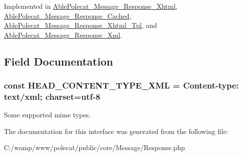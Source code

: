 Implemented in \hyperlink{class_able_polecat___message___response___xhtml_a858ab2a95af7d312509c203de5c6fb11}{Able\+Polecat\+\_\+\+Message\+\_\+\+Response\+\_\+\+Xhtml}, \hyperlink{class_able_polecat___message___response___cached_a858ab2a95af7d312509c203de5c6fb11}{Able\+Polecat\+\_\+\+Message\+\_\+\+Response\+\_\+\+Cached}, \hyperlink{class_able_polecat___message___response___xhtml___tpl_a858ab2a95af7d312509c203de5c6fb11}{Able\+Polecat\+\_\+\+Message\+\_\+\+Response\+\_\+\+Xhtml\+\_\+\+Tpl}, and \hyperlink{class_able_polecat___message___response___xml_a858ab2a95af7d312509c203de5c6fb11}{Able\+Polecat\+\_\+\+Message\+\_\+\+Response\+\_\+\+Xml}.



\subsection{Field Documentation}
\hypertarget{interface_able_polecat___message___response_interface_a91ffe0d292e492f470fd5917d700ce9a}{}
\subsubsection[{H\+E\+A\+D\+\_\+\+C\+O\+N\+T\+E\+N\+T\+\_\+\+T\+Y\+P\+E\+\_\+\+X\+M\+L}]{\setlength{\rightskip}{0pt plus 5cm}const H\+E\+A\+D\+\_\+\+C\+O\+N\+T\+E\+N\+T\+\_\+\+T\+Y\+P\+E\+\_\+\+X\+M\+L = \textquotesingle{}Content-\/type\+: text/xml; charset=utf-\/8\textquotesingle{}}\label{interface_able_polecat___message___response_interface_a91ffe0d292e492f470fd5917d700ce9a}
Some supported mime types. 

The documentation for this interface was generated from the following file\+:\begin{DoxyCompactItemize}
\item 
C\+:/wamp/www/polecat/public/core/\+Message/Response.\+php\end{DoxyCompactItemize}
